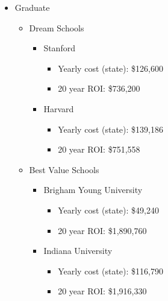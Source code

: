 \begin{itemize}
    \item{Graduate} 
    \begin{itemize}
        \item{Dream Schools}
            \begin{itemize}
                \item{Stanford}
                    \begin{itemize}
                        \item{Yearly cost (state):} \$126,600
                        \item{20 year ROI:} \$736,200
                    \end{itemize}
                \item{Harvard}
                    \begin{itemize}
                        \item{Yearly cost (state):} \$139,186
                        \item{20 year ROI:} \$751,558
                    \end{itemize}
            \end{itemize}
        \item{Best Value Schools} 
            \begin{itemize}
                \item{Brigham Young University}
                    \begin{itemize}
                        \item{Yearly cost (state):} \$49,240
                        \item{20 year ROI:} \$1,890,760
                    \end{itemize}
                \item{Indiana University}
                    \begin{itemize}
                        \item{Yearly cost (state):} \$116,790
                        \item{20 year ROI:} \$1,916,330
                    \end{itemize}
            \end{itemize}
    \end{itemize}
\end{itemize}

